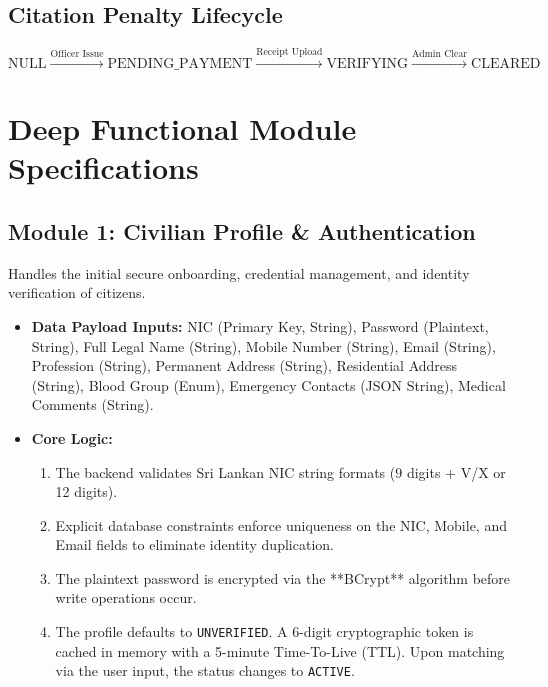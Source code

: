 \documentclass[12pt, a4paper]{article}
\begin{document}
\subsection{Citation Penalty Lifecycle}
$$\text{NULL} \xrightarrow{\text{Officer Issue}} \text{PENDING\_PAYMENT} \xrightarrow{\text{Receipt Upload}} \text{VERIFYING} \xrightarrow{\text{Admin Clear}} \text{CLEARED}$$

\newpage

\section{Deep Functional Module Specifications}

\subsection{Module 1: Civilian Profile \& Authentication}
Handles the initial secure onboarding, credential management, and identity verification of citizens.
\begin{itemize}
    \item \textbf{Data Payload Inputs:} NIC (Primary Key, String), Password (Plaintext, String), Full Legal Name (String), Mobile Number (String), Email (String), Profession (String), Permanent Address (String), Residential Address (String), Blood Group (Enum), Emergency Contacts (JSON String), Medical Comments (String).
    \item \textbf{Core Logic:}
    \begin{enumerate}
        \item The backend validates Sri Lankan NIC string formats (9 digits + V/X or 12 digits).
        \item Explicit database constraints enforce uniqueness on the NIC, Mobile, and Email fields to eliminate identity duplication.
        \item The plaintext password is encrypted via the **BCrypt** algorithm before write operations occur.
        \item The profile defaults to \texttt{UNVERIFIED}. A 6-digit cryptographic token is cached in memory with a 5-minute Time-To-Live (TTL). Upon matching via the user input, the status changes to \texttt{ACTIVE}.
    \end{enumerate}
\end{itemize}
\end{document}
